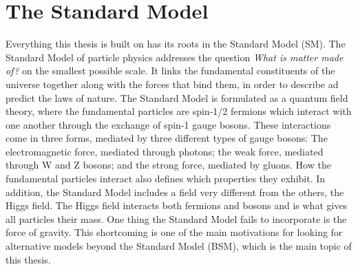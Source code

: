 \section{The Standard Model}
Everything this thesis is built on has its roots in the Standard Model (SM). The Standard Model of particle physics addresses the question \emph{What is matter made of?} on the smallest possible scale. It links the fundamental constituents of the universe together along with the forces that bind them, in order to describe ad predict the laws of nature. The Standard Model is formulated as a quantum field theory, where the fundamental particles are spin-1/2 fermions which interact with one another through the exchange of spin-1 gauge bosons. These interactions come in three forms, mediated by three different types of gauge bosons: The electromagnetic force, mediated through photons; the weak force, mediated through W and Z bosons; and the strong force, mediated by gluons. How the fundamental particles interact also defines which properties they exhibit. In addition, the Standard Model includes a field very different from the others, the Higgs field. The Higgs field interacts both fermions and bosons and is what gives all particles their mass.\newline
One thing the Standard Model fails to incorporate is the force of gravity. This shortcoming is one of the main motivations for looking for alternative models beyond the Standard Model (BSM), which is the main topic of this thesis.

